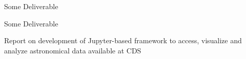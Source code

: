 \begin{workpackage}
\begin{wpdescription}
\end{wpdescription}

\begin{tasklist}
% 





\end{tasklist}



\begin{wpdelivs}
\begin{wpdeliv}[due=1,miles=startup,id=infrastructure,dissem=PU,nature=DEC,lead=SRL]
  {Some Deliverable}
\end{wpdeliv}
\begin{wpdeliv}[due=1,miles=startup,id=opendose-analysis,dissem=PU,nature=DEM,lead=INSERM]
  {Some Deliverable}
\end{wpdeliv}
\begin{wpdeliv}[due=1,miles=startup,id=application-astro,dissem=PU,nature=R,lead=CDS]
  {Report on development of Jupyter-based framework to access, visualize and analyze astronomical data available at CDS}
\end{wpdeliv}

\end{wpdelivs}
\end{workpackage}

